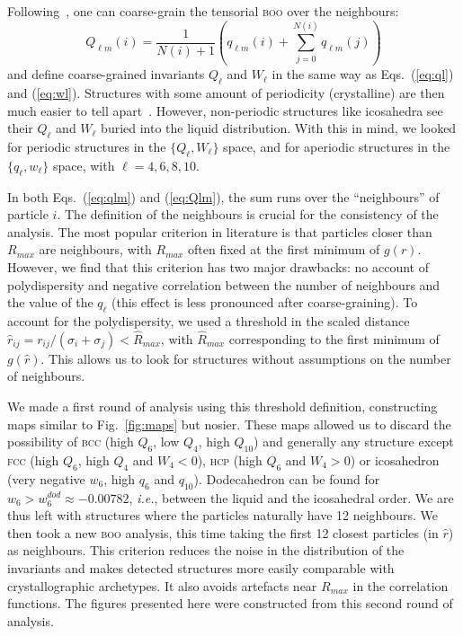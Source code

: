 Following~\citet{Lechner2008}, one can coarse-grain the tensorial \textsc{boo} over the neighbours:
\begin{equation}
	Q_{\ell m}(i) = \frac{1}{N(i)+1}\left( q_{\ell m}(i) +  \sum_{j=0}^{N(i)} q_{\ell m}(j)\right) 
	\label{eq:Qlm}
\end{equation}
and define coarse-grained invariants $Q_\ell$ and $W_\ell$ in the same way as Eqs.~(\ref{eq:ql}) and (\ref{eq:wl}). Structures with some amount of periodicity (crystalline) are then much easier to tell apart~\citep{Lechner2008}. However, non-periodic structures like icosahedra see their $Q_\ell$ and $W_\ell$ buried into the liquid distribution. With this in mind, we looked for periodic structures in the $\lbrace Q_\ell, W_\ell\rbrace$ space, and for aperiodic structures in the $\lbrace q_\ell, w_\ell\rbrace$ space, with $\ell=4,6,8,10$.

In both Eqs.~(\ref{eq:qlm}) and (\ref{eq:Qlm}), the sum runs over the ``neighbours'' of particle $i$. The definition of the neighbours is crucial for the consistency of the analysis. The most popular criterion in literature is that particles closer than $R_{max}$ are neighbours, with $R_{max}$ often fixed at the first minimum of $g(r)$. However, we find that this criterion has two major drawbacks: no account of polydispersity and negative correlation between the number of neighbours and the value of the $q_\ell$ (this effect is less pronounced after coarse-graining). To account for the polydispersity, we used a threshold in the scaled distance $\hat{r}_{i j} = r_{i j} /(\sigma_i+\sigma_j) < \hat{R}_{max}$, with $\hat{R}_{max}$ corresponding to the first minimum of $g(\hat{r})$. This allows us to look for structures without assumptions on the number of neighbours. 

We made a first round of analysis using this threshold definition, constructing maps similar to Fig.~\ref{fig:maps} but nosier. These maps allowed us to discard the possibility of \textsc{bcc} (high $Q_6$, low $Q_4$, high $Q_{10}$) and generally any structure except \textsc{fcc} (high $Q_6$, high $Q_4$ and $W_4<0$), \textsc{hcp} (high $Q_6$ and $W_4>0$) or icosahedron (very negative $w_6$, high $q_6$ and $q_{10}$). Dodecahedron can be found for $w_6>w_6^{dod}\approx -0.00782$, \emph{i.e.}, between the liquid and the icosahedral order. We are thus left with structures where the particles naturally have 12 neighbours. We then took a new \textsc{boo} analysis, this time taking the first 12 closest particles (in $\hat{r}$) as neighbours. This criterion reduces the noise in the distribution of the invariants and makes detected structures more easily comparable with crystallographic archetypes. It also avoids artefacts near $R_{max}$ in the correlation functions. The figures presented here were constructed from this second round of analysis.

